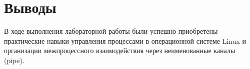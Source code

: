 \section{Выводы}

В ходе выполнения лабораторной работы были успешно приобретены практические навыки управления процессами в операционной системе Linux и организации межпроцессного взаимодействия через неименованные каналы (pipe).

\pagebreak
